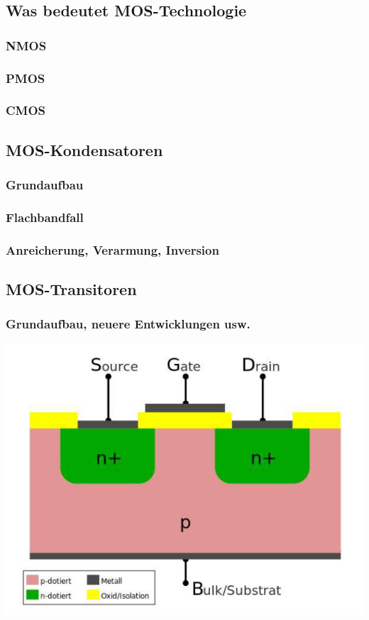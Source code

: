 
\subsection{Was bedeutet MOS-Technologie}
	\subsubsection{NMOS}
	\subsubsection{PMOS}
	\subsubsection{CMOS}
\subsection{MOS-Kondensatoren}
	\subsubsection{Grundaufbau}
	\subsubsection{Flachbandfall}
	\subsubsection{Anreicherung, Verarmung, Inversion}
\subsection{MOS-Transitoren}
	\subsubsection{Grundaufbau, neuere Entwicklungen usw.}
	
	\begin{center}
		\includegraphics[width=0.7\linewidth]{Kapitel/Kap06/MOS_Transistor.png}
	\end{center}
		
